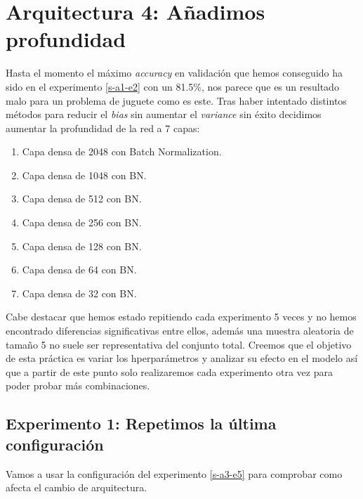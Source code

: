 \documentclass{article}
\begin{document}
	\section{Arquitectura 4: A\~nadimos profundidad}
		Hasta el momento el m\'aximo \textit{accuracy} en validaci\'on que hemos conseguido ha sido en el experimento \ref{s-a1-e2} con un 81.5\%, nos parece que es un resultado malo para un problema de juguete como es este. Tras haber intentado distintos m\'etodos para reducir el \textit{bias} sin aumentar el \textit{variance} sin \'exito decidimos aumentar la profundidad de la red a 7 capas:
		\begin{enumerate}
			\item Capa densa de 2048 con Batch Normalization.
			\item Capa densa de 1048 con BN.
			\item Capa densa de 512 con BN.
			\item Capa densa de 256 con BN.
			\item Capa densa de 128 con BN.
			\item Capa densa de 64 con BN.
			\item Capa densa de 32 con BN.
		\end{enumerate}
		
		Cabe destacar que hemos estado repitiendo cada experimento 5 veces y no hemos encontrado diferencias significativas entre ellos, adem\'as una muestra aleatoria de tama\~no 5 no suele ser representativa del conjunto total. Creemos que el objetivo de esta pr\'actica es variar los hperpar\'ametros y analizar su efecto en el modelo as\'i que a partir de este punto solo realizaremos cada experimento otra vez para poder probar m\'as combinaciones.
		
		\subsection{Experimento 1: Repetimos la \'ultima configuraci\'on}
			Vamos a usar la configuraci\'on del experimento \ref{s-a3-e5} para comprobar como afecta el cambio de arquitectura.
			
\end{document}
